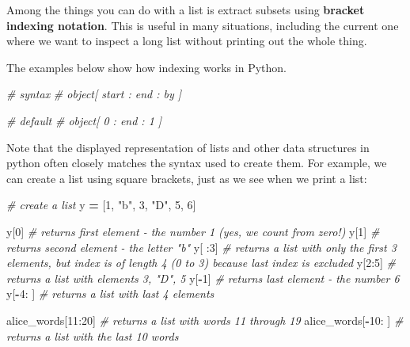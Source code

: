 \documentclass[]{book}
\newenvironment{Shaded}{\begin{snugshade}}{\end{snugshade}}
\newcommand{\CommentTok}[1]{\textcolor[rgb]{0.56,0.35,0.01}{\textit{#1}}}
\newcommand{\DecValTok}[1]{\textcolor[rgb]{0.00,0.00,0.81}{#1}}
\newcommand{\NormalTok}[1]{#1}
\newcommand{\OperatorTok}[1]{\textcolor[rgb]{0.81,0.36,0.00}{\textbf{#1}}}
\newcommand{\StringTok}[1]{\textcolor[rgb]{0.31,0.60,0.02}{#1}}
\begin{document}
Among the things you can do with a list is extract subsets using \textbf{bracket indexing notation}. This is useful in many situations, including the current one where we want to inspect a long list without printing out the whole thing.

The examples below show how indexing works in Python.

\begin{Shaded}
\begin{Highlighting}[]
\CommentTok{# syntax}
\CommentTok{# object[ start : end : by ]}

\CommentTok{# default}
\CommentTok{# object[ 0 : end : 1 ]}
\end{Highlighting}
\end{Shaded}

Note that the displayed representation of lists and other data structures in python often closely matches the syntax used to create them. For example, we can create a list using square brackets, just as we see when we print a list:

\begin{Shaded}
\begin{Highlighting}[]
\CommentTok{# create a list}
\NormalTok{y }\OperatorTok{=}\NormalTok{ [}\DecValTok{1}\NormalTok{, }\StringTok{"b"}\NormalTok{, }\DecValTok{3}\NormalTok{, }\StringTok{"D"}\NormalTok{, }\DecValTok{5}\NormalTok{, }\DecValTok{6}\NormalTok{]}

\NormalTok{y[}\DecValTok{0}\NormalTok{] }\CommentTok{# returns first element - the number 1 (yes, we count from zero!)}
\NormalTok{y[}\DecValTok{1}\NormalTok{] }\CommentTok{# returns second element - the letter "b"}
\NormalTok{y[ :}\DecValTok{3}\NormalTok{] }\CommentTok{# returns a list with only the first 3 elements, but index is of length 4 (0 to 3) because last index is excluded}
\NormalTok{y[}\DecValTok{2}\NormalTok{:}\DecValTok{5}\NormalTok{] }\CommentTok{# returns a list with elements 3, "D", 5}
\NormalTok{y[}\OperatorTok{-}\DecValTok{1}\NormalTok{] }\CommentTok{# returns last element - the number 6 }
\NormalTok{y[}\OperatorTok{-}\DecValTok{4}\NormalTok{: ] }\CommentTok{# returns a list with last 4 elements}
\end{Highlighting}
\end{Shaded}

\begin{Shaded}
\begin{Highlighting}[]
\NormalTok{alice_words[}\DecValTok{11}\NormalTok{:}\DecValTok{20}\NormalTok{] }\CommentTok{# returns a list with words 11 through 19}
\NormalTok{alice_words[}\OperatorTok{-}\DecValTok{10}\NormalTok{: ] }\CommentTok{# returns a list with the last 10 words}
\end{Highlighting}
\end{Shaded}
\end{document}
